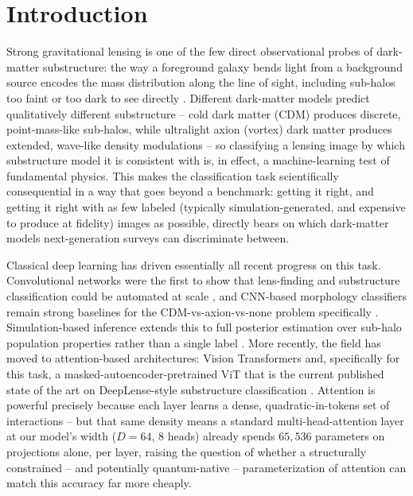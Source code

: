 \documentclass[10pt,letterpaper]{article}
\theoremstyle{plain}
\theoremstyle{definition}
\begin{document}
\section{Introduction}

Strong gravitational lensing is one of the few direct observational probes
of dark-matter substructure: the way a foreground galaxy bends light from
a background source encodes the mass distribution along the line of sight,
including sub-halos too faint or too dark to see directly
\citep{dalal2002detecting}. Different dark-matter models predict
qualitatively different substructure -- cold dark matter (CDM) produces
discrete, point-mass-like sub-halos, while ultralight axion (vortex) dark
matter produces extended, wave-like density modulations
\citep{hui2017ultralight} -- so classifying a lensing image by which
substructure model it is consistent with is, in effect, a machine-learning
test of fundamental physics. This makes the classification task
scientifically consequential in a way that goes beyond a benchmark: getting
it right, and getting it right with as few labeled (typically
simulation-generated, and expensive to produce at fidelity) images as
possible, directly bears on which dark-matter models next-generation
surveys can discriminate between.

Classical deep learning has driven essentially all recent progress on this
task. Convolutional networks were the first to show that lens-finding and
substructure classification could be automated at scale
\citep{hezaveh2017fast,lanusse2018cmu}, and CNN-based morphology
classifiers remain strong baselines for the CDM-vs-axion-vs-none problem
specifically \citep{alexander2020deep}. Simulation-based inference extends
this to full posterior estimation over sub-halo population properties
rather than a single label \citep{brehmer2019mining}. More recently, the
field has moved to attention-based architectures: Vision Transformers
\citep{dosovitskiy2021image} and, specifically for this task, a masked-autoencoder-pretrained ViT that is the current published state of the
art on DeepLense-style substructure classification \citep{prasha2025masked}.
Attention is powerful precisely because each layer learns a dense,
quadratic-in-tokens set of interactions -- but that same density means a
standard multi-head-attention layer at our model's width ($D{=}64$, 8
heads) already spends $65{,}536$ parameters on projections alone, per layer,
raising the question of whether a structurally constrained -- and
potentially quantum-native -- parameterization of attention can match this
accuracy far more cheaply.
\end{document}
